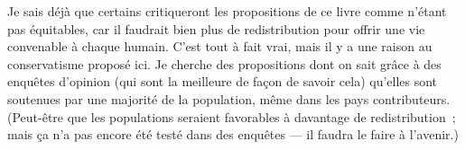 \documentclass[a5paper,french,openany]{memoir}
\begin{document}
Je sais déjà que certains critiqueront les propositions de ce livre comme n'étant pas équitables, car il faudrait bien plus de redistribution pour offrir une vie convenable %
à chaque humain. C'est tout à fait vrai, mais il y a une raison au conservatisme proposé ici. 
Je cherche des propositions dont on sait grâce à des enquêtes d'opinion (qui sont la meilleure de façon de savoir cela) qu'elles sont soutenues par une majorité de la population, même dans les pays contributeurs. (Peut-être que les populations seraient favorables à davantage de redistribution~; mais ça n'a pas encore été testé dans des enquêtes --- il faudra le faire à l'avenir.) %
\end{document}
